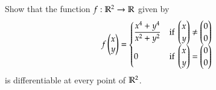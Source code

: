Show that the function $f : \mathbb{R}^2 \to \mathbb{R}$ given by
\[f\begin{pmatrix} x \\ y \end{pmatrix} = \begin{cases} \displaystyle
\frac{x^4+y^4}{x^2+y^2} & \text{if } \begin{pmatrix} x \\ y \end{pmatrix}\neq \begin{pmatrix} 0 \\ 0 \end{pmatrix} \\
0 & \text{if } \begin{pmatrix} x \\ y \end{pmatrix} = \begin{pmatrix} 0 \\ 0 \end{pmatrix}\end{cases}
\]
is differentiable at every point of $\mathbb{R}^2$.                                                                                                                                                                                                                                                                                                                                                                                                                                                                                                                                                                                                                                                                                                                                                                                                                                                                                                                                                                                                                                                                                                                                                                                                                                                                                                                                                                                                                                                                                                                                                                                                                                                                                                                                                                                                                                                                                                                                                                                                                                                                                                                                                                                                                                                                                                                                                                                                                                                                                                                                                                                                                                                                                                                                                                                   
